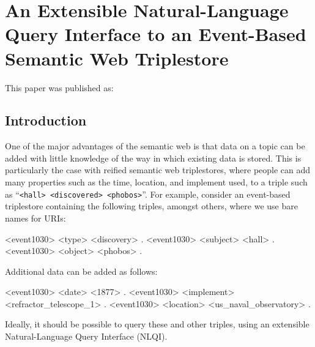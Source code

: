 \documentclass[../main.tex]{subfiles}
\begin{document}
\chapter{An Extensible Natural-Language Query Interface to an Event-Based Semantic Web Triplestore}
\begin{refsection}

\label{chapter:nliwod2018conf}

This paper was published as:



\section{Introduction}

One of the major advantages of the semantic web is that data on a topic can be added with little
knowledge of the way in which existing data is stored. This is particularly the case with reified semantic web
triplestores, where people can add many properties such as the time, location, and implement used, to
a triple such as ``\texttt{<hall> <discovered> <phobos>}''. For example, consider an event-based triplestore containing the following triples, amongst others, where we use bare names for URIs:

\begin{code}
	<event1030> <type> <discovery> .
	<event1030> <subject> <hall> .
	<event1030> <object> <phobos> .
\end{code}

Additional data can be added as follows:

\begin{code}
	<event1030> <date> <1877> .
	<event1030> <implement> <refractor_telescope_1> .
	<event1030> <location> <us_naval_observatory> .
\end{code}

Ideally, it should be possible to query these and other triples, using an extensible Natural-Language Query Interface (NLQI).


\end{refsection}
\end{document}
